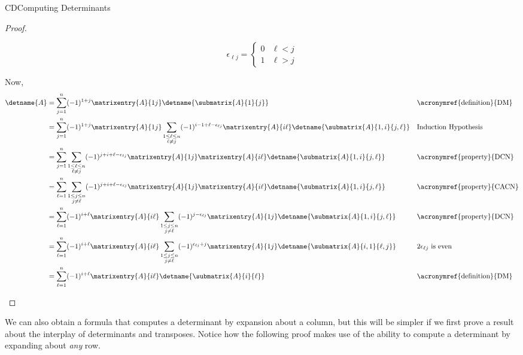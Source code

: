 \begin{subsect}{CD}{Computing Determinants}
\begin{proof}
\begin{para}
%
\begin{equation*}
\epsilon_{\ell j}=
\begin{cases}
0 & \ell<j\\
1 & \ell>j
\end{cases}
\end{equation*}
\end{para}
%
\begin{para}Now,
%
\begin{align*}
\detname{A}
&=
\sum_{j=1}^{n}(-1)^{1+j}\matrixentry{A}{1j}\detname{\submatrix{A}{1}{j}}
&&\text{\acronymref{definition}{DM}}\\
%
&=
\sum_{j=1}^{n}(-1)^{1+j}\matrixentry{A}{1j}
\sum_{\substack{1\leq\ell\leq n\\\ell\neq j}}
(-1)^{i-1+\ell-\epsilon_{\ell j}}\matrixentry{A}{i\ell}\detname{\submatrix{A}{1,i}{j,\ell}}
&&\text{Induction Hypothesis}\\
%
&=
\sum_{j=1}^{n}\sum_{\substack{1\leq\ell\leq n\\\ell\neq j}}
(-1)^{j+i+\ell-\epsilon_{\ell j}}
\matrixentry{A}{1j}\matrixentry{A}{i\ell}\detname{\submatrix{A}{1,i}{j,\ell}}
&&\text{\acronymref{property}{DCN}}\\
%
&=
\sum_{\ell=1}^{n}\sum_{\substack{1\leq j\leq n\\j\neq\ell}}
(-1)^{j+i+\ell-\epsilon_{\ell j}}
\matrixentry{A}{1j}\matrixentry{A}{i\ell}\detname{\submatrix{A}{1,i}{j,\ell}}
&&\text{\acronymref{property}{CACN}}\\
%
&=
\sum_{\ell=1}^{n}(-1)^{i+\ell}\matrixentry{A}{i\ell}
\sum_{\substack{1\leq j\leq n\\j\neq\ell}}
(-1)^{j-\epsilon_{\ell j}}
\matrixentry{A}{1j}\detname{\submatrix{A}{1,i}{j,\ell}}
&&\text{\acronymref{property}{DCN}}\\
&=
\sum_{\ell=1}^{n}(-1)^{i+\ell}\matrixentry{A}{i\ell}
\sum_{\substack{1\leq j\leq n\\j\neq\ell}}
(-1)^{\epsilon_{\ell j}+j}
\matrixentry{A}{1j}\detname{\submatrix{A}{i,1}{\ell,j}}
&&\text{$2\epsilon_{\ell j}$ is even}\\
&=
\sum_{\ell=1}^{n}(-1)^{i+\ell}\matrixentry{A}{i\ell}\detname{\submatrix{A}{i}{\ell}}
&&\text{\acronymref{definition}{DM}}
%
\end{align*}
\end{para}
%
\end{proof}
%
\begin{para}We can also obtain a formula that computes a determinant by expansion about a column, but this will be simpler if we first prove a result about the interplay of determinants and transposes.  Notice how the following proof makes use of the ability to compute a determinant by expanding about {\em any} row.\end{para}

\end{subsect}
